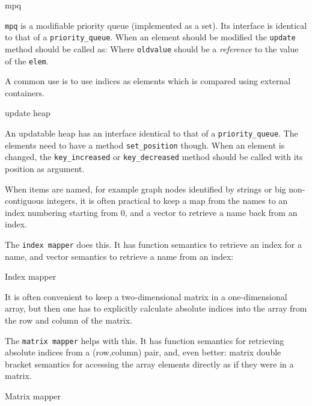 \begin{algorithm}{mpq}

\desc
{\tt mpq} is a modifiable priority queue (implemented as a set). Its interface
is identical to that of a {\tt priority\_queue}. When an element should be
modified the {\tt update} method should be called as:
Where {\tt oldvalue} should be a \emph{reference} to the value of the
{\tt elem}.

\desc
A common use is to use indices as elements which is compared using external
containers.
\end{algorithm}

\begin{algorithm}{update heap}

\desc
An updatable heap has an interface identical to that of a
{\tt priority\_queue}.
The elements need to have a method {\tt set\_position} though. When an element
is changed, the {\tt key\_increased} or {\tt key\_decreased} method should
be called with its position as argument.
\end{algorithm}

When items are named, for example graph nodes identified by strings or big
non-contiguous integers, it is often practical to keep a map from the
names to an index numbering starting from 0, and a vector to retrieve a name
back from an index.

The {\tt index mapper} does this.
It has function semantics to retrieve an index for a name,
and vector semantics to retrieve a name from an index:
\begin{algorithm}{Index mapper}
\end{algorithm}

It is often convenient to keep a two-dimensional matrix in a one-dimensional
array, but then one has to explicitly calculate absolute indices into the
array from the row and column of the matrix.

The {\tt matrix mapper} helps with this.
It has function semantics for retrieving absolute indices from a (row,column)
pair, and, even better: matrix double bracket semantics for accessing the
array elements directly as if they were in a matrix.
\begin{algorithm}{Matrix mapper}
\end{algorithm}

